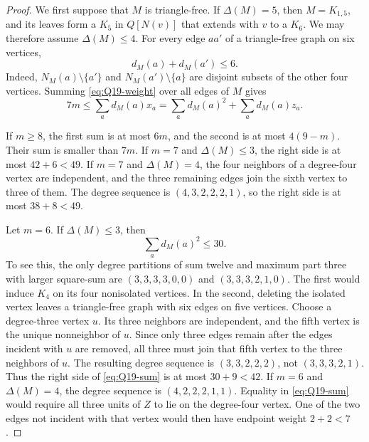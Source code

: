 \documentclass[11pt,reqno,a4paper]{amsart}
\theoremstyle{definition}
\theoremstyle{remark}
\begin{document}
\begin{proof}
We first suppose that $M$ is triangle-free.  If $\Delta(M)=5$, then
$M=K_{1,5}$, and its leaves form a $K_5$ in $Q[N(v)]$ that extends with
$v$ to a $K_6$.  We may therefore assume $\Delta(M)\leq4$.  For every
edge $aa'$ of a triangle-free graph on six vertices,
\[
  d_M(a)+d_M(a')\leq6.
\]
Indeed, $N_M(a)\setminus\{a'\}$ and
$N_M(a')\setminus\{a\}$ are disjoint subsets of the other four vertices.
Summing \eqref{eq:Q19-weight} over all edges of $M$ gives
\begin{equation}\label{eq:Q19-sum}
  7m
  \leq\sum_a d_M(a)x_a
  =\sum_a {d_M(a)}^2+\sum_a d_M(a)z_a.
\end{equation}

If $m\geq8$, the first sum is at most $6m$, and the second is at most
$4(9-m)$.  Their sum is smaller than $7m$.  If $m=7$ and
$\Delta(M)\leq3$, the right side is at most $42+6<49$.  If $m=7$ and
$\Delta(M)=4$, the four neighbors of a degree-four vertex are independent,
and the three remaining edges join the sixth vertex to three of them.  The
degree sequence is $(4,3,2,2,2,1)$, so the right side is at most
$38+8<49$.

Let $m=6$.  If $\Delta(M)\leq3$, then
\begin{equation}\label{eq:Q19-square30}
  \sum_a {d_M(a)}^2\leq30.
\end{equation}
To see this, the only degree partitions of sum twelve and maximum part three
with larger square-sum are $(3,3,3,3,0,0)$ and $(3,3,3,2,1,0)$.  The first
would induce $K_4$ on its four nonisolated vertices.  In the second, deleting
the isolated vertex leaves a triangle-free graph with six edges on five
vertices.  Choose a degree-three vertex $u$.  Its three neighbors are
independent, and the fifth vertex is the unique nonneighbor of $u$.  Since
only three edges remain after the edges incident with $u$ are removed, all
three must join that fifth vertex to the three neighbors of $u$.  The
resulting degree sequence is $(3,3,2,2,2)$, not $(3,3,3,2,1)$.  Thus the
right side of \eqref{eq:Q19-sum} is at most
$30+9<42$.  If $m=6$ and $\Delta(M)=4$, the degree sequence is
$(4,2,2,2,1,1)$.  Equality in \eqref{eq:Q19-sum} would require all three
units of $Z$ to lie on the degree-four vertex.  One of the two edges not
incident with that vertex would then have endpoint weight $2+2<7$.


\end{proof}
\end{document}
